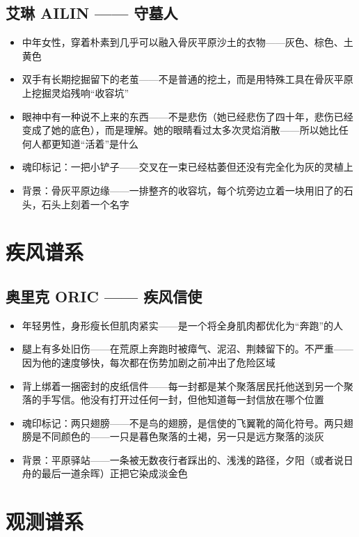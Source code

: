 \documentclass[12pt,a4paper,openany]{ctexbook}
\begin{document}
\subsection{艾琳 AILIN —— 守墓人}
\begin{itemize}
    \item 中年女性，穿着朴素到几乎可以融入骨灰平原沙土的衣物——灰色、棕色、土黄色
    \item 双手有长期挖掘留下的老茧——不是普通的挖土，而是用特殊工具在骨灰平原上挖掘灵焰残响“收容坑”
    \item 眼神中有一种说不上来的东西——不是悲伤（她已经悲伤了四十年，悲伤已经变成了她的底色），而是理解。她的眼睛看过太多次灵焰消散——所以她比任何人都更知道“活着”是什么
    \item 魂印标记：一把小铲子——交叉在一束已经枯萎但还没有完全化为灰的灵植上
    \item 背景：骨灰平原边缘——一排整齐的收容坑，每个坑旁边立着一块用旧了的石头，石头上刻着一个名字
\end{itemize}

\section{疾风谱系}

\subsection{奥里克 ORIC —— 疾风信使}
\begin{itemize}
    \item 年轻男性，身形瘦长但肌肉紧实——是一个将全身肌肉都优化为“奔跑”的人
    \item 腿上有多处旧伤——在荒原上奔跑时被瘴气、泥沼、荆棘留下的。不严重——因为他的速度够快，每次都在伤势加剧之前冲出了危险区域
    \item 背上绑着一捆密封的皮纸信件——每一封都是某个聚落居民托他送到另一个聚落的手写信。他没有打开过任何一封，但他知道每一封信放在哪个位置
    \item 魂印标记：两只翅膀——不是鸟的翅膀，是信使的飞翼靴的简化符号。两只翅膀是不同颜色的——一只是暮色聚落的土褐，另一只是远方聚落的淡灰
    \item 背景：平原驿站——一条被无数夜行者踩出的、浅浅的路径，夕阳（或者说日舟的最后一道余晖）正把它染成淡金色
\end{itemize}

\section{观测谱系}
\end{document}
